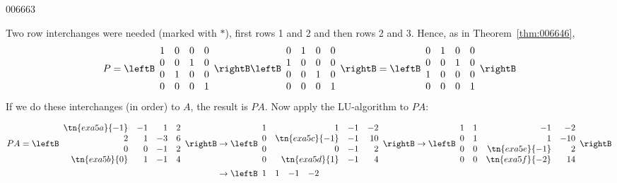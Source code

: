\begin{example}{}{006663}
\begin{solution}
Two row interchanges were needed (marked with $*$), first rows 1 and 2 and then rows 2 and 3. Hence, as in Theorem~\ref{thm:006646},
\begin{equation*}
P = \leftB \begin{array}{rrrr}
1 & 0 & 0 & 0 \\
0 & 0 & 1 & 0 \\
0 & 1 & 0 & 0 \\
0 & 0 & 0 & 1
\end{array} \rightB \leftB \begin{array}{rrrr}
0 & 1 & 0 & 0\\
1 & 0 & 0 & 0 \\
0 & 0 & 1 & 0 \\
0 & 0 & 0 & 1
\end{array} \rightB = \leftB \begin{array}{rrrr}
0 & 1 & 0 & 0\\
0 & 0 & 1 & 0 \\
1 & 0 & 0 & 0 \\
0 & 0 & 0 & 1
\end{array} \rightB
\end{equation*}
If we do these interchanges (in order) to $A$, the result is $PA$. Now apply the LU-algorithm to $PA$:
\begin{table}[H]
\begin{align*}
PA = \leftB \begin{array}{rrrr}
\tn{exa5a}{-1} & -1 & 1 & 2 \\
2 & 1 & -3 & 6 \\
0 & 0 & -1 & 2 \\
\tn{exa5b}{0} & 1 & -1 & 4
\end{array} \rightB &\rightarrow
\leftB \begin{array}{rrrr}
1 & 1 & -1 & -2 \\
0 & \tn{exa5c}{-1} & -1 & 10 \\
0 & 0 & -1 & 2 \\
0 & \tn{exa5d}{1} & -1 & 4
\end{array} \rightB \rightarrow
\leftB \begin{array}{rrrr}
1 & 1 & -1 & -2 \\
0 & 1 & 1 & -10 \\
0 & 0 & \tn{exa5e}{-1} & 2 \\
0 & 0 & \tn{exa5f}{-2} & 14
\end{array} \rightB \\
&\rightarrow \leftB \begin{array}{rrrr}
1 & 1 & -1 & -2 \\

\end{array}
\end{align*}
\end{table}
\end{solution}
\end{example}
